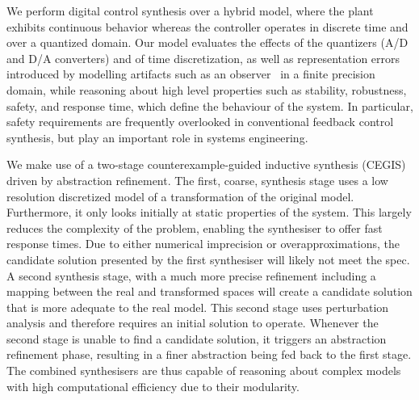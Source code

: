 \documentclass[sigconf]{llncs}
\begin{document}
We perform digital control synthesis over a hybrid model, where the plant
exhibits continuous behavior whereas the controller operates in discrete
time and over a quantized domain.  Our model evaluates the effects of the
quantizers (A/D and D/A converters) and of time discretization, as well as
representation errors introduced by modelling artifacts such as an
observer~\cite{astrom1997computer} in a finite precision domain, while
reasoning about high level properties such as stability, robustness, safety,
and response time, which define the behaviour of the system.  In particular,
safety requirements are frequently overlooked in conventional feedback
control synthesis, but play an important role in systems engineering.


We make use of a two-stage counterexample-guided inductive
synthesis (CEGIS) driven by abstraction refinement.
The first, coarse, synthesis stage uses a low resolution discretized model of a 
transformation of the original model. Furthermore, it only looks initially at
static properties  of the system. This largely reduces the complexity of
the problem, enabling the synthesiser to offer fast response times. %
Due to either numerical imprecision or overapproximations, the
candidate solution presented by the first synthesiser will likely not
meet the spec. A second synthesis stage, with a much more precise
refinement including a mapping between the real and transformed spaces
will create a candidate solution that is more adequate to the real
model. This second stage uses perturbation analysis and therefore
requires an initial solution to operate.  Whenever the second stage is
unable to find a candidate solution, it triggers an abstraction
refinement phase, resulting in a finer abstraction being fed back to
the first stage.  The combined synthesisers are thus capable of
reasoning about complex models with high computational efficiency due
to their modularity.

\end{document}
